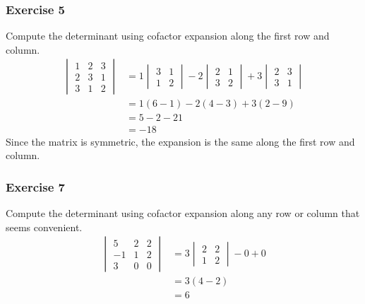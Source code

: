 \documentclass{math}
\begin{document}
\subsubsection*{Exercise 5}
Compute the determinant using cofactor expansion along the first row and column.
\begin{align*}
  \begin{vmatrix}
    1 & 2 & 3 \\
    2 & 3 & 1 \\
    3 & 1 & 2
  \end{vmatrix} &= 1\begin{vmatrix}3 & 1 \\ 1 & 2\end{vmatrix}-
    2\begin{vmatrix}2 & 1 \\ 3 & 2\end{vmatrix}+
    3\begin{vmatrix}2 & 3 \\ 3 & 1\end{vmatrix} \\
  &= 1(6-1)-2(4-3)+3(2-9) \\
  &= 5-2-21 \\
  &= -18
\end{align*}
Since the matrix is symmetric, the expansion is the same along the first row and
column.

\subsubsection*{Exercise 7}
Compute the determinant using cofactor expansion along any row or column that
seems convenient.
\begin{align*}
  \begin{vmatrix}
    5 & 2 & 2 \\
    -1 & 1 & 2 \\
    3 & 0 & 0
  \end{vmatrix} &= 3\begin{vmatrix}2 & 2 \\ 1 & 2\end{vmatrix}-0+0 \\
  &= 3(4-2) \\
  &= 6
\end{align*}
\end{document}
